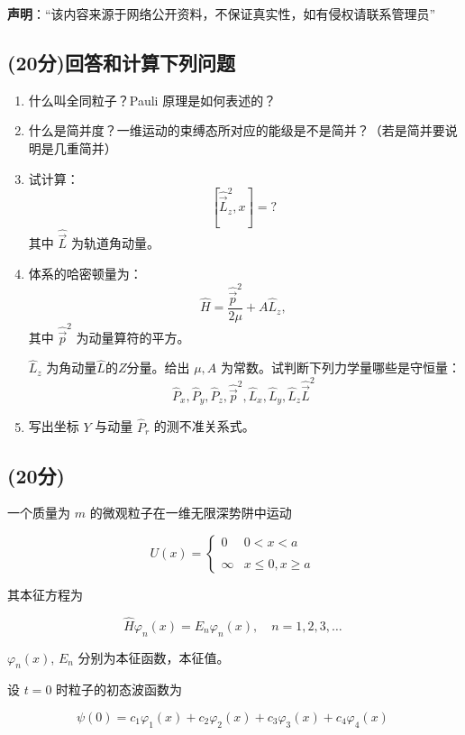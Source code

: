 
\textbf{声明}：“该内容来源于网络公开资料，不保证真实性，如有侵权请联系管理员”

\subsection{(20分)回答和计算下列问题}
\begin{enumerate}
    \item  什么叫全同粒子？Pauli 原理是如何表述的？

    \item  什么是简并度？一维运动的束缚态所对应的能级是不是简并？（若是简并要说明是几重简并）

    \item  试计算：
    \[    \left[\hat{\vec{L}}^2_z, x\right] = ?  ~\]
    其中 $\hat{\vec{L}}$ 为轨道角动量。

    \item  体系的哈密顿量为：
    \[    \hat{H} = \frac{\hat{\vec{p}}^2}{2\mu} + A\hat{L}_z,  ~\]
    其中 $\hat{\vec{p}}^2$ 为动量算符的平方。

    $\hat{L}_z$ 为角动量$\hat{L}$的$Z$分量。给出 $ \mu, A$ 为常数。试判断下列力学量哪些是守恒量：
    \[  \hat{P}_x, \hat{P}_y, \hat{P}_z,\hat{\vec{p}}^2, \hat{L}_x, \hat{L}_y, \hat{L}_z \hat{\vec{L}}^2~\]

    \item  写出坐标 $Y$ 与动量 $\hat{P}_r$ 的测不准关系式。
\end{enumerate}
\subsection{(20分)}
一个质量为 $m$ 的微观粒子在一维无限深势阱中运动

\[U(x) = \begin{cases} 0 & 0 < x < a \\\\\infty & x \leq 0, x \geq a \end{cases}~\]

其本征方程为

\[\hat{H} \varphi_n (x) = E_n \varphi_n (x), \quad n = 1, 2, 3, \ldots~\]

\(\varphi_n (x)\), \(E_n\) 分别为本征函数，本征值。

设 \( t = 0 \) 时粒子的初态波函数为

\[\psi (0) = c_1 \varphi_1 (x) + c_2 \varphi_2 (x) + c_3 \varphi_3 (x) + c_4 \varphi_4 (x)~\]

